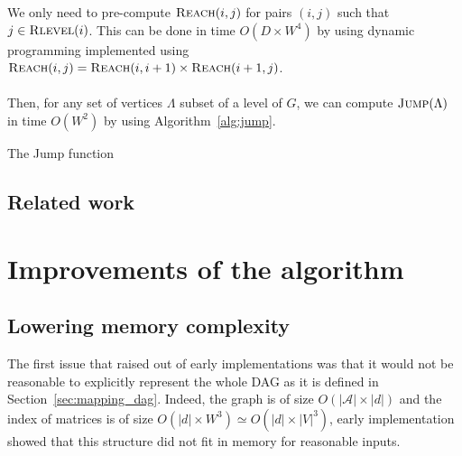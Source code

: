 \documentclass[12px]{article}
\theoremstyle{definition}
\begin{document}
          We only need to pre-compute $\Call{Reach}{i, j}$ for pairs $(i, j)$
          such that $j \in \Call{Rlevel}{i}$. This can be done in time $O(D
          \times W^{4})$ by using dynamic programming implemented using
          $\Call{Reach}{i, j} = \Call{Reach}{i, i+1} \times \Call{Reach}{i+1,
          j}$.

        \paragraph{} Then, for any set of vertices $\Lambda$ subset of a level
        of $G$, we can compute $\Call{Jump}{\Lambda}$ in time $O(W^2)$ by using
        Algorithm~\ref{alg:jump}.

        \begin{algorithm}[H]
          \caption{The Jump function}%
          \label{alg:jump}
          \begin{algorithmic}[1]
                \State{\Return{$\Lambda$}}
              \Else{}
              \EndIf{}
            \EndFunction{}
          \end{algorithmic}
        \end{algorithm}

    \subsection{Related work}


  \section{Improvements of the algorithm}

    \subsection{Lowering memory complexity}

      The first issue that raised out of early implementations was that it
      would not be reasonable to explicitly represent the whole DAG as it is
      defined in Section~\ref{sec:mapping_dag}. Indeed, the graph is of size
      $O(|\mathcal{A}| \times |d|)$ and the index of matrices 
      is of size $O(|d| \times W^3) \simeq O(|d| \times |V|^3)$, early
      implementation showed that this structure did not fit in memory for
      reasonable inputs.
\end{document}
